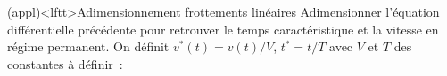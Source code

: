 \documentclass[../../main/main.tex]{subfiles}
\begin{document}
\begin{tcb*}[list entry={\lte\theappl~:~Adimensionne\mnt\ frotte\mnt\ linéaires}]
	(appl)<lftt>{Adimensionnement frottements linéaires}
	Adimensionner l'équation différentielle précédente pour retrouver le temps
	caractéristique et la vitesse en régime permanent.
	\tcblower
	On définit $v^*(t) = v(t)/V$, $t^* = t/T$ avec $V$ et $T$ des constantes à
	définir~:
	\smallbreak
	\begin{isd}[righthand ratio=.4]
		\tcblower
		\begin{center}
			\label{fig:cl_fl-v}
		\end{center}
	\end{isd}
\end{tcb*}
\end{document}
